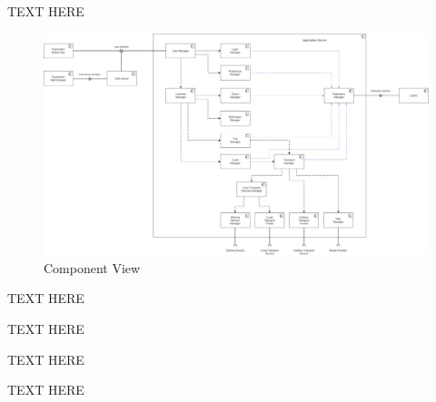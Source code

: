 
TEXT HERE

\begin{figure}[H]
	\centering
	\includegraphics[scale=0.2]{Images/Architecture/Components_View}
	\caption{Component View}
\end{figure}


TEXT HERE


TEXT HERE


TEXT HERE


TEXT HERE